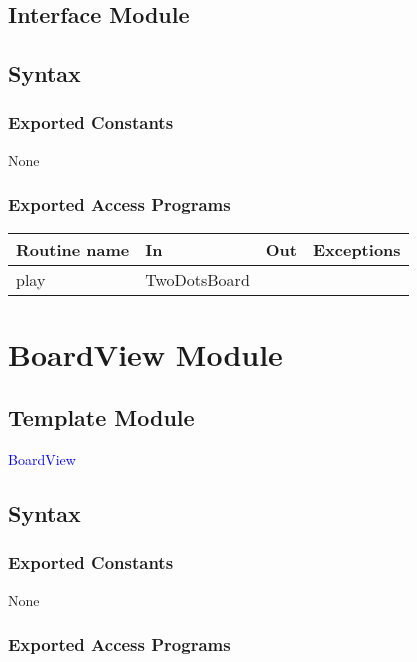 \documentclass[12pt]{article}
\begin{document}
\subsection* {Interface Module}


\subsection* {Syntax}

\subsubsection* {Exported Constants}

None

\subsubsection* {Exported Access Programs}

\begin{tabular}{| l | l | l | p{6cm} |}
\hline
\textbf{Routine name} & \textbf{In} & \textbf{Out} & \textbf{Exceptions}\\
\hline
play & TwoDotsBoard & & \\
\hline
\end{tabular}

\newpage

\section* {BoardView Module}

\subsection* {Template Module}

\noindent \textcolor{blue}{BoardView}

\subsection* {Syntax}

\subsubsection* {Exported Constants}

None

\subsubsection* {Exported Access Programs}
\end{document}
